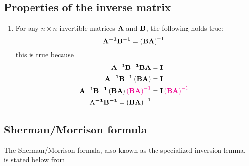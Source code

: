 \documentclass[12pt]{article}
\begin{document}
\subsection{Properties of the inverse matrix}
\begin{enumerate}
    \item For any $n\times n$ invertible matrices $\boldsymbol{\mathbf{A}}$ and $\boldsymbol{\mathbf{B}}$, the 
    following holds true:
    \begin{equation}
        \boldsymbol{\mathbf{A^{-1}}} \boldsymbol{\mathbf{B^{-1}}} = \left(\boldsymbol{\mathbf{B A}}\right)^{-1}
    \end{equation}
    this is true because
    \begin{equation*}
    \begin{aligned}
        \boldsymbol{\mathbf{A^{-1}}}\boldsymbol{\mathbf{B^{-1}}}\boldsymbol{\mathbf{B A}} &= \boldsymbol{\mathbf{I}}\\
        \boldsymbol{\mathbf{A^{-1}}}\boldsymbol{\mathbf{B^{-1}}}\left(\boldsymbol{\mathbf{B A}}\right) &= \boldsymbol{\mathbf{I}}\\
        \boldsymbol{\mathbf{A^{-1}}}\boldsymbol{\mathbf{B^{-1}}}\left(\boldsymbol{\mathbf{B A}}\right)\color{magenta}\left(\boldsymbol{\mathbf{B A}}\right)^{-1}\color{black} &= \boldsymbol{\mathbf{I}}\color{magenta}\left(\boldsymbol{\mathbf{B A}}\right)^{-1}\color{black} \\
        \boldsymbol{\mathbf{A^{-1}}} \boldsymbol{\mathbf{B^{-1}}} = \left(\boldsymbol{\mathbf{B A}}\right)^{-1}
    \end{aligned}
    \end{equation*}
\end{enumerate}



\subsection{Sherman/Morrison formula}
The Sherman/Morrison formula, also known as the specialized inversion lemma, is stated below from \cite[p.~50]{bongard2006probabilistic}
\end{document}
